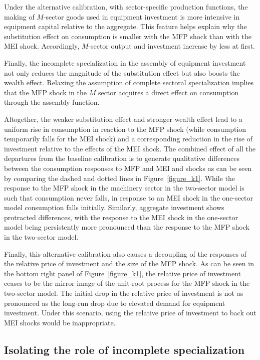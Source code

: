 \documentclass[12pt,fleqn]{article}
\begin{document}
{\normalsize Under the alternative calibration, with sector-specific
production functions, the making of $M$-sector goods used in equipment
investment is more intensive in equipment capital relative to the aggregate.
This feature helps explain why  the substitution effect on consumption is
smaller with the MFP shock than with the MEI shock. Accordingly, $M$-sector
output and investment increase by less at first.  }

{\normalsize Finally, the incomplete specialization in the assembly of
equipment investment not only reduces the magnitude of the substitution
effect but also boosts the wealth effect. Relaxing the assumption of
complete sectoral specialization implies that the MFP shock in the $M$
sector acquires a direct effect on consumption through the assembly
function.  }

{\normalsize Altogether, the weaker substitution effect and stronger wealth
effect lead to a uniform rise in consumption in reaction to the MFP shock
(while consumption temporarily falls for the MEI shock) and a corresponding
reduction in the rise of investment relative to the effects of the MEI
shock. The combined effect of all the departures from the baseline
calibration is to generate qualitative differences between the consumption
responses to MFP and MEI and shocks as can be seen by comparing the dashed
and dotted lines in Figure~\ref{figure_k1}. While the response to the MFP
shock in the machinery sector in the two-sector model is such that
consumption never falls, in response to an MEI shock in the one-sector model
consumption falls initially. Similarly, aggregate investment shows
protracted differences, with the response to the MEI shock in the one-sector
model being persistently more pronounced than the response to the MFP shock
in the two-sector model.  }

{\normalsize Finally, this alternative calibration also causes a decoupling
of the responses of the relative price of investment and the size of the MFP
shock. As can be seen in the bottom right panel of Figure~\ref{figure_k1},
the relative price of investment ceases to be the mirror image of the
unit-root process for the MFP shock in the two-sector model. The initial
drop in the relative price of investment is not as pronounced as the
long-run drop due to elevated demand for equipment investment. Under this
scenario, using the relative price of investment to back out MEI shocks
would be inappropriate. }

\subsection{\protect\normalsize Isolating the role of incomplete
specialization}
\end{document}
